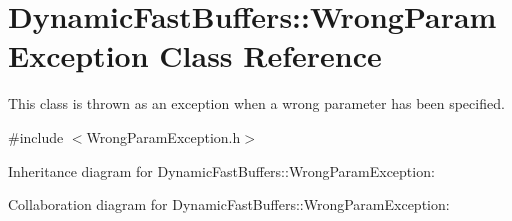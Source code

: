 \hypertarget{class_dynamic_fast_buffers_1_1_wrong_param_exception}{\section{Dynamic\-Fast\-Buffers\-:\-:Wrong\-Param\-Exception Class Reference}
\label{class_dynamic_fast_buffers_1_1_wrong_param_exception}
}


This class is thrown as an exception when a wrong parameter has been specified.  




{\ttfamily \#include $<$Wrong\-Param\-Exception.\-h$>$}



Inheritance diagram for Dynamic\-Fast\-Buffers\-:\-:Wrong\-Param\-Exception\-:


Collaboration diagram for Dynamic\-Fast\-Buffers\-:\-:Wrong\-Param\-Exception\-:
